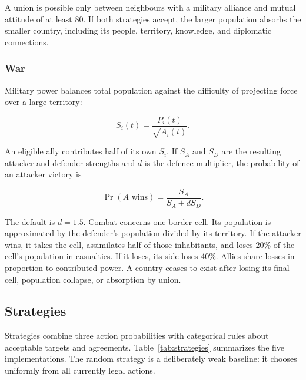 \documentclass[10pt,twocolumn]{article}
\begin{document}
A union is possible only between neighbours with a military alliance and
mutual attitude of at least 80.  If both strategies accept, the larger
population absorbs the smaller country, including its people, territory,
knowledge, and diplomatic connections.

\subsubsection{War}

Military power balances total population against the difficulty of projecting
force over a large territory:

\begin{equation}
S_i(t)=\frac{P_i(t)}{\sqrt{A_i(t)}}.
\end{equation}

An eligible ally contributes half of its own $S_i$.  If $S_A$ and $S_D$ are
the resulting attacker and defender strengths and $d$ is the defence
multiplier, the probability of an attacker victory is

\begin{equation}
\Pr(A\text{ wins})=\frac{S_A}{S_A+dS_D}.
\end{equation}

The default is $d=1.5$.  Combat concerns one border cell.  Its population is
approximated by the defender's population divided by its territory.  If the
attacker wins, it takes the cell, assimilates half of those inhabitants, and
loses 20\% of the cell's population in casualties.  If it loses, its side
loses 40\%.  Allies share losses in proportion to contributed power.  A
country ceases to exist after losing its final cell, population collapse, or
absorption by union.

\subsection{Strategies}

Strategies combine three action probabilities with categorical rules about
acceptable targets and agreements.  Table~\ref{tab:strategies} summarizes
the five implementations.  The random strategy is a deliberately weak
baseline: it chooses uniformly from all currently legal actions.
\end{document}
